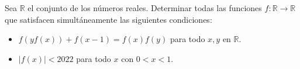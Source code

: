 Sea $\mathbb R$ el conjunto de los números reales. Determinar todas las funciones $f: \mathbb R \to \mathbb R$ que satisfacen simultáneamente las siguientes condiciones:
 \begin{itemize} 
 \item $f(yf(x))+f(x-1)=f(x)f(y)$ para todo $x,y$ en $\mathbb R$.
 \item $|f(x)|\lt 2022$ para todo $x$ con $0\lt x \lt 1$.
 \end{itemize} 

